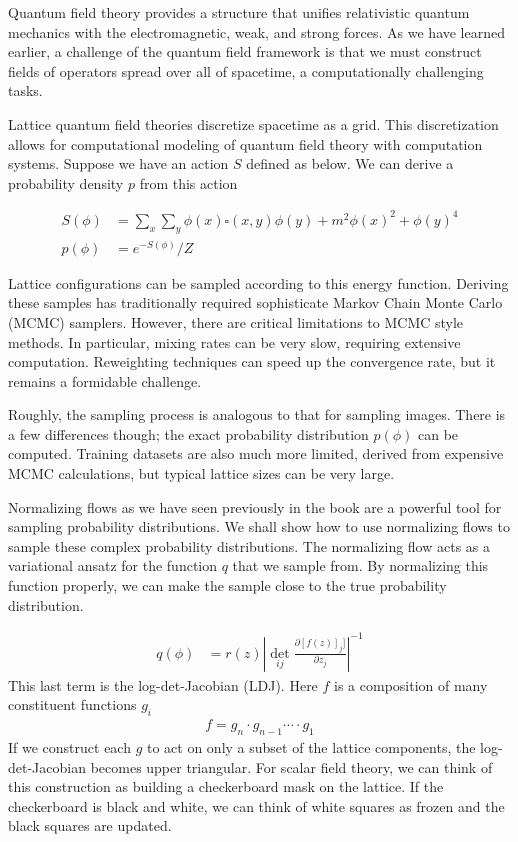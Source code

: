 \documentclass[book.tex]{subfiles}
\begin{document}
Quantum field theory provides a structure that unifies relativistic quantum mechanics with the electromagnetic, weak, and strong forces. As we have learned earlier, a challenge of the quantum field framework is that we must construct fields of operators spread over all of spacetime, a computationally challenging tasks.

Lattice quantum field theories discretize spacetime as a grid. This discretization allows for computational modeling of quantum field theory with computation systems. Suppose we have an action $S$ defined as below. We can derive a probability density $p$ from this action

\begin{align}
S(\phi) &= \sum_x \sum_y \phi(x) \square(x, y) \phi(y) + m^2 \phi(x)^2 + \phi(y)^4 \\
p(\phi) &= e^{-S(\phi)}/Z
\end{align}


Lattice configurations can be sampled according to this energy function. Deriving these samples has traditionally required sophisticate Markov Chain Monte Carlo (MCMC) samplers. However, there are critical limitations to MCMC style methods. In particular, mixing rates can be very slow, requiring extensive computation. Reweighting techniques can speed up the convergence rate, but it remains a formidable challenge.


Roughly, the sampling process is analogous to that for sampling images. There is a few differences though; the exact probability distribution $p(\phi)$ can be computed. Training datasets are also much more limited, derived from expensive MCMC calculations, but typical lattice sizes can be very large.%

Normalizing flows as we have seen previously in the book are a powerful tool for sampling probability distributions. We shall show how to use normalizing flows to sample these complex probability distributions. The normalizing flow acts as a variational ansatz for the function $q$ that we sample from. By normalizing this function properly, we can make the sample close to the true probability distribution.

\begin{align}
 q(\phi) &= r(z) \left | \det_{ij} \frac{\partial [f(z)]_j]}{\partial z_j} \right |^{-1}
\end{align}
This last term is the log-det-Jacobian (LDJ). Here $f$ is a composition of many constituent functions $g_i$
\begin{align}
f = g_n \cdot g_{n-1} \cdots \cdot g_1
\end{align}
If we construct each $g$ to act on only a subset of the lattice components, the log-det-Jacobian becomes upper triangular. For scalar field theory, we can think of this construction as building a checkerboard mask on the lattice. If the checkerboard is black and white, we can think of white squares as frozen and the black squares are updated. 
\end{document}
